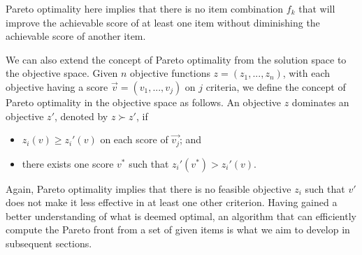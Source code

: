 Pareto optimality here implies that there is no item combination $f_k$ that will improve the achievable score of at least one item without diminishing the achievable score of another item.

We can also extend the concept of Pareto optimality from the solution space to the objective space. Given $n$ objective functions $z = (z_1,...,z_n)$, with each objective having a score $\Vec{v} = (v_1,...,v_j)$ on $j$ criteria, we define the concept of Pareto optimality in the objective space as follows. An objective $z$ dominates an objective $z'$, denoted by $z \succ z'$, if
\begin{itemize}
    \item $z_i(v) \geq z_i'(v)$ on each score of $\Vec{v_j}$; and
    \item there exists one score $v^*$ such that $z_i'(v^*) > z_i'(v)$.
\end{itemize}

Again, Pareto optimality implies that there is no feasible objective $z_i$ such that $v'$ does not make it less effective in at least one other criterion.\newline
Having gained a better understanding of what is deemed optimal, an algorithm that can efficiently compute the Pareto front from a set of given items is what we aim to develop in subsequent sections.



